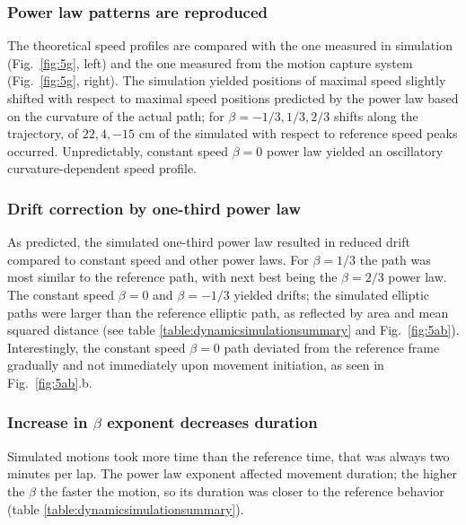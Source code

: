 \subsubsection{Power law patterns are reproduced}

The theoretical speed profiles are compared with the one measured in simulation (Fig.~\ref{fig:5g}, left) and the one measured from the motion capture system (Fig.~\ref{fig:5g}, right).
The simulation yielded positions of maximal speed slightly shifted with respect to maximal speed positions predicted by the power law based on the curvature of the actual path; for $\beta=-1/3,1/3,2/3$ shifts along the trajectory, of $22,4,-15$ cm of the simulated with respect to reference speed peaks occurred.
Unpredictably, constant speed $\beta=0$ power law yielded an oscillatory curvature-dependent speed profile. 

\subsubsection{Drift correction by one-third power law}
As predicted, the simulated one-third power law resulted in reduced drift compared to constant speed and other power laws. For $\beta=1/3$ the path was most similar to the reference path, with next best being the $\beta=2/3$ power law. The constant speed $\beta=0$ and $\beta=-1/3$ yielded drifts; the simulated elliptic paths were larger than the reference elliptic path, as reflected by area and mean squared distance (see table \ref{table:dynamicsimulationsummary} and Fig.~\ref{fig:5ab}). Interestingly, the constant speed $\beta=0$ path deviated from the reference frame gradually and not immediately upon movement initiation, as seen in  Fig.~\ref{fig:5ab}.b.


\subsubsection{Increase in $\beta$ exponent decreases duration}
Simulated motions took more time than the reference time, that was always two minutes per lap. The power law exponent affected movement duration; the higher the $\beta$ the faster the motion, so its duration was closer to the reference behavior (table \ref{table:dynamicsimulationsummary}).



